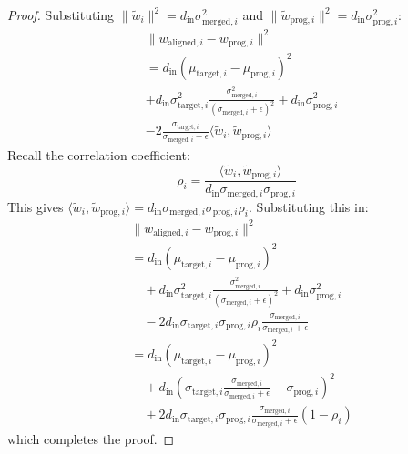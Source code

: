 \documentclass{article}
\theoremstyle{plain}
\theoremstyle{definition}
\theoremstyle{remark}
\begin{document}
\begin{proof}
Substituting $\|\tilde{w}_i\|^2 = d_{\mathrm{in}} \sigma_{\mathrm{merged}, i}^2$ and $\|\tilde{w}_{\mathrm{prog}, i}\|^2 = d_{\mathrm{in}} \sigma_{\mathrm{prog}, i}^2$:
\begin{equation}
\begin{split}
  &\|w_{\mathrm{aligned}, i} - w_{\mathrm{prog}, i}\|^2 \\
  &= d_{\mathrm{in}} (\mu_{\mathrm{target}, i} - \mu_{\mathrm{prog}, i})^2 \\
  &+ d_{\mathrm{in}} \sigma_{\mathrm{target}, i}^2 \frac{\sigma_{\mathrm{merged}, i}^2}{(\sigma_{\mathrm{merged}, i} + \epsilon)^2} + d_{\mathrm{in}} \sigma_{\mathrm{prog}, i}^2 \\
  &- 2 \frac{\sigma_{\mathrm{target}, i}}{\sigma_{\mathrm{merged}, i} + \epsilon} \langle \tilde{w}_i, \tilde{w}_{\mathrm{prog}, i} \rangle
\end{split}
\end{equation}
Recall the correlation coefficient:
\begin{equation}
  \rho_i = \frac{\langle \tilde{w}_i, \tilde{w}_{\mathrm{prog}, i} \rangle}{d_{\mathrm{in}} \sigma_{\mathrm{merged}, i} \sigma_{\mathrm{prog}, i}}
\end{equation}
This gives $\langle \tilde{w}_i, \tilde{w}_{\mathrm{prog}, i} \rangle = d_{\mathrm{in}} \sigma_{\mathrm{merged}, i} \sigma_{\mathrm{prog}, i} \rho_i$. Substituting this in:
\begin{equation}
\begin{split}
  &\|w_{\mathrm{aligned}, i} - w_{\mathrm{prog}, i}\|^2 \\
  &= d_{\mathrm{in}} (\mu_{\mathrm{target}, i} - \mu_{\mathrm{prog}, i})^2 \\
  &\quad + d_{\mathrm{in}} \sigma_{\mathrm{target}, i}^2 \frac{\sigma_{\mathrm{merged}, i}^2}{(\sigma_{\mathrm{merged}, i} + \epsilon)^2} + d_{\mathrm{in}} \sigma_{\mathrm{prog}, i}^2 \\
  &\quad - 2 d_{\mathrm{in}} \sigma_{\mathrm{target}, i} \sigma_{\mathrm{prog}, i} \rho_i \frac{\sigma_{\mathrm{merged}, i}}{\sigma_{\mathrm{merged}, i} + \epsilon} \\
  &= d_{\mathrm{in}} (\mu_{\mathrm{target}, i} - \mu_{\mathrm{prog}, i})^2 \\
  &\quad + d_{\mathrm{in}} \left( \sigma_{\mathrm{target}, i} \frac{\sigma_{\mathrm{merged}, i}}{\sigma_{\mathrm{merged}, i} + \epsilon} - \sigma_{\mathrm{prog}, i} \right)^2 \\
  &\quad + 2 d_{\mathrm{in}} \sigma_{\mathrm{target}, i} \sigma_{\mathrm{prog}, i} \frac{\sigma_{\mathrm{merged}, i}}{\sigma_{\mathrm{merged}, i} + \epsilon} (1 - \rho_i)
\end{split}
\end{equation}
which completes the proof.
\end{proof}
\end{document}
